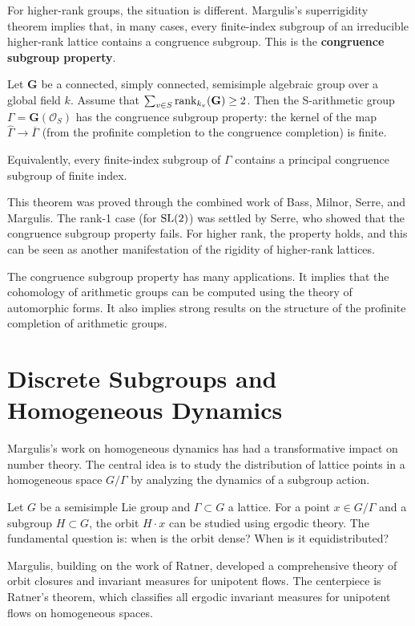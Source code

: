 For higher-rank groups, the situation is different. Margulis's superrigidity theorem implies that, in many cases, every finite-index subgroup of an irreducible higher-rank lattice contains a congruence subgroup. This is the \textbf{congruence subgroup property}.

\begin{theorem}
Let \(\mathbf{G}\) be a connected, simply connected, semisimple algebraic group over a global field \(k\). Assume that \(\sum_{v \in S} \rank_{k_v}(\mathbf{G}) \geq 2\). Then the S-arithmetic group \(\Gamma = \mathbf{G}(\mathcal{O}_S)\) has the congruence subgroup property: the kernel of the map \(\widehat{\Gamma} \to \overline{\Gamma}\) (from the profinite completion to the congruence completion) is finite.

Equivalently, every finite-index subgroup of \(\Gamma\) contains a principal congruence subgroup of finite index.
\end{theorem}

This theorem was proved through the combined work of Bass, Milnor, Serre, and Margulis. The rank-1 case (for \(\operatorname{SL}(2)\)) was settled by Serre, who showed that the congruence subgroup property fails. For higher rank, the property holds, and this can be seen as another manifestation of the rigidity of higher-rank lattices.

The congruence subgroup property has many applications. It implies that the cohomology of arithmetic groups can be computed using the theory of automorphic forms. It also implies strong results on the structure of the profinite completion of arithmetic groups.

\section{Discrete Subgroups and Homogeneous Dynamics}

Margulis's work on homogeneous dynamics has had a transformative impact on number theory. The central idea is to study the distribution of lattice points in a homogeneous space \(G/\Gamma\) by analyzing the dynamics of a subgroup action.

Let \(G\) be a semisimple Lie group and \(\Gamma \subset G\) a lattice. For a point \(x \in G/\Gamma\) and a subgroup \(H \subset G\), the orbit \(H \cdot x\) can be studied using ergodic theory. The fundamental question is: when is the orbit dense? When is it equidistributed?

Margulis, building on the work of Ratner, developed a comprehensive theory of orbit closures and invariant measures for unipotent flows. The centerpiece is Ratner's theorem, which classifies all ergodic invariant measures for unipotent flows on homogeneous spaces.

